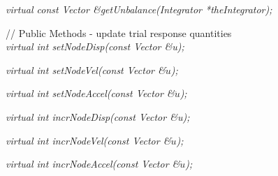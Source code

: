 {\em virtual const Vector \&getUnbalance(Integrator *theIntegrator); }

\indent // Public Methods - update trial response quantities  \\ 
{\em virtual int setNodeDisp(const Vector \&u);} 

{\em virtual int setNodeVel(const Vector \&$\dot u$);}

{\em virtual int setNodeAccel(const Vector \&$\ddot u$);}

{\em virtual int incrNodeDisp(const Vector \&u);} 

{\em virtual int incrNodeVel(const Vector \&$\dot u$);}

{\em virtual int incrNodeAccel(const Vector \&$\ddot u$);}


